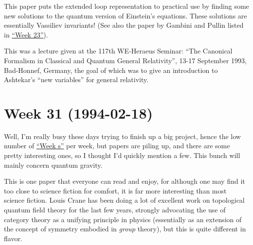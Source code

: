 \documentclass{article}
\def\tightlist{}
\renewcommand{\texttt}[1]{%
  \begingroup
  \ttfamily
  \begingroup\lccode`~=`/\lowercase{\endgroup\def~}{/\discretionary{}{}{}}%
  \begingroup\lccode`~=`[\lowercase{\endgroup\def~}{[\discretionary{}{}{}}%
  \begingroup\lccode`~=`.\lowercase{\endgroup\def~}{.\discretionary{}{}{}}%
  \catcode`/=\active\catcode`[=\active\catcode`.=\active
  \scantokens{#1\noexpand}%
  \endgroup
}
\begin{document}
This paper puts the extended loop representation to practical use by
finding some new solutions to the quantum version of Einstein's
equations. These solutions are essentially Vassiliev invariants! (See
also the paper by Gambini and Pullin listed in
\protect\hyperlink{week23}{``Week 23''}).


This was a lecture given at the 117th WE-Heraeus Seminar: ``The
Canonical Formalism in Classical and Quantum General Relativity'', 13-17
September 1993, Bad-Honnef, Germany, the goal of which was to give an
introduction to Ashtekar's ``new variables'' for general relativity.
\hypertarget{week31}{%
\section{Week 31 (1994-02-18)}\label{week31}}

Well, I'm really busy these days trying to finish up a big project,
hence the low number of \protect\hyperlink{weeks}{``Week s''} per week,
but papers are piling up, and there are some pretty interesting ones, so
I thought I'd quickly mention a few. This bunch will mainly concern
quantum gravity.


This is one paper that everyone can read and enjoy, for although one may
find it too close to science fiction for comfort, it is far more
interesting than most science fiction. Louis Crane has been doing a lot
of excellent work on topological quantum field theory for the last few
years, strongly advocating the use of category theory as a unifying
principle in physics (essentially as an extension of the concept of
symmetry embodied in \emph{group} theory), but this is quite different
in flavor.
\end{document}

